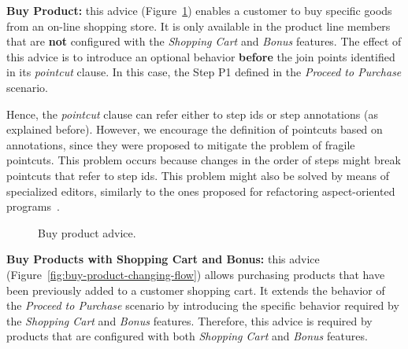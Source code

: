 {\bf Buy Product:} this advice (Figure~\ref{fig:buy-product-scenario}) enables a
customer to buy specific goods from an on-line shopping store. It is only
available in the product line members that are {\bf not} configured with the
\emph{Shopping Cart} and \emph{Bonus} features. The effect of this advice is to
introduce an optional behavior {\bf before} the join points identified in its
\emph{pointcut} clause. In this case, the Step P1 defined in the \emph{Proceed to
Purchase} scenario.

{\color{red} Hence, the \emph{pointcut} clause can refer either to step ids or
step annotations (as explained before). However, we encourage the definition of
pointcuts based on annotations, since they were proposed to mitigate the problem
of fragile pointcuts. This problem occurs because changes in the order of
steps might break pointcuts that refer to step ids.} {\color{blue}This problem
might also be solved by means of specialized editors, similarly to the ones proposed for
refactoring aspect-oriented programs~\cite{Wloka:2008aa}.}
 
\begin{figure}[h]
\caption{Buy product advice.}
\label{fig:buy-product-scenario}
\end{figure}

{\bf Buy Products with Shopping Cart and Bonus:} this advice
(Figure~\ref{fig:buy-product-changing-flow}) allows purchasing products
that have been previously added to a customer shopping cart. It extends the
behavior of the \emph{Proceed to Purchase} scenario by introducing the specific
behavior required by the \emph{Shopping Cart} and
\emph{Bonus} features. Therefore, this advice is required by products that
are configured with both \emph{Shopping Cart} and \emph{Bonus} features.

